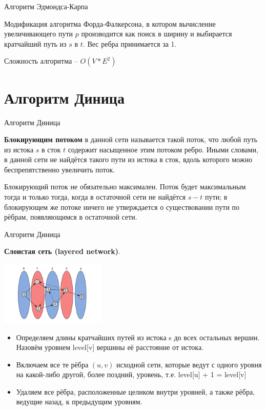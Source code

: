 \documentclass[10pt]{beamer}
\begin{document}
\begin{frame}[fragile]{Алгоритм Эдмондса-Карпа}

Модификация алгоритма Форда-Фалкерсона, в котором вычисление увеличивающего пути $p$ производится как поиск в ширину и выбирается кратчайший путь из $s$ в $t$. Вес ребра принимается за 1.

Сложность алгоритма -- $O( V * E^2)$

\end{frame}

\section{Алгоритм Диница}

\begin{frame}[fragile]{Алгоритм Диница}

\textbf{Блокирующим потоком} в данной сети называется такой поток, что любой путь из истока $s$ в сток $t$ содержит насыщенное этим потоком ребро. Иными словами, в данной сети не найдётся такого пути из истока в сток, вдоль которого можно беспрепятственно увеличить поток.

Блокирующий поток не обязательно максимален. Поток будет максимальным тогда и только тогда, когда в остаточной сети не найдётся $s-t$ пути; в блокирующем же потоке ничего не утверждается о существовании пути по рёбрам, появляющимся в остаточной сети.

\end{frame}

\begin{frame}[fragile]{Алгоритм Диница}

\textbf{Слоистая сеть (layered network)}. 

\begin{center}
    \includegraphics[width=5cm]{Term_2/Source/images/8-layered-network.png}
\end{center}

\begin{itemize}
    \item Определяем длины кратчайших путей из истока s до всех остальных вершин. Назовём уровнем {\rm level}[v] вершины её расстояние от истока. 
    \item Включаем все те рёбра $(u,v)$ исходной сети, которые ведут с одного уровня на какой-либо другой, более поздний, уровень, т.е. {\rm level}[u] + 1 = {\rm level}[v]
    \item Удаляем все рёбра, расположенные целиком внутри уровней, а также рёбра, ведущие назад, к предыдущим уровням.
\end{itemize}

\end{frame}
\end{document}
